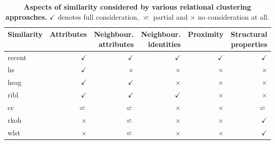 \begin{table}
    \centering

    \caption[Aspects of similarity considered by various relational clustering approaches]{\textbf{Aspects of similarity considered by various relational clustering approaches.} $\checkmark$ denotes full consideration, $\backsimeq$ partial and $\times$ no consideration at all.  }
    \label{tab:Props}
    \begin{tabular}{@{}lrrrrr@{}}
        \toprule
        \textbf{Similarity}  & {\footnotesize\textbf{Attributes}} & \makecell{\footnotesize\textbf{Neighbour.} \\ \footnotesize\textbf{attributes}} & \makecell{\footnotesize\textbf{Neighbour.} \\ \footnotesize\textbf{identities}}  & {\footnotesize\textbf{Proximity}} & \makecell{\footnotesize\textbf{Structural} \\ \footnotesize\textbf{properties}}    \\
        \midrule
         \gls{recent}                & $\checkmark$        & $\checkmark$                      & $\checkmark$                        & $\checkmark$       & $\checkmark$ \\

         \gls{hs}                  & $\checkmark$        & $\times$                          & $\times$                            & $\times$           & $\times$   \\

         \gls{hsag}               & $\checkmark$        & $\checkmark$                      & $\times$                            & $\times$           & $\times$   \\

         \gls{ribl}               & $\checkmark$        & $\checkmark$                      & $\checkmark$                        & $\times$           & $\times$  \\

         \gls{cc}                  & $\backsimeq$        & $\backsimeq$                      & $\times$                            & $\times$           & $\backsimeq$   \\

         \gls{rkoh}                & $\times$            & $\backsimeq$                      & $\times$                            & $\times$           & $\checkmark$ \\

         \gls{wlst}                & $\times$            & $\backsimeq$                      & $\times$                            & $\times$           & $\checkmark$ \\
         \bottomrule
    \end{tabular}

\end{table}


